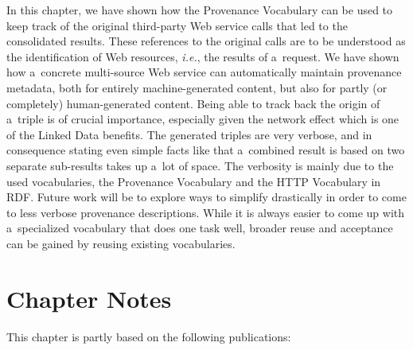 In this chapter, we have shown how the Provenance
Vocabulary can be used to keep track of the original
third-party Web service calls that led to the consolidated
results. These references to the original calls
are to be understood as the identification of Web resources,
\emph{i.e.}, the results of a~request.
We have shown how a~concrete multi-source Web service can
automatically maintain provenance metadata,
both for entirely machine-generated content,
but also for partly (or completely) human-generated content.
Being able to track back the origin of a~triple
is of crucial importance,
especially given the network effect which is one of the
Linked Data benefits.
The generated triples are very verbose,
and in consequence stating even simple facts like
that a~combined result is based on two separate sub-results
takes up a~lot of space.
The verbosity is mainly due to the used vocabularies,
the Provenance Vocabulary and the HTTP Vocabulary in RDF.
Future work will be to explore ways
to simplify drastically in order to come to
less verbose provenance descriptions.
While it is always easier to come up with a~specialized vocabulary
that does one task well, broader reuse and acceptance
can be gained by reusing existing vocabularies.

\section*{Chapter Notes}
This chapter is partly based on the following publications:



